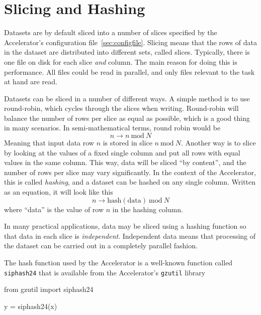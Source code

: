 \section{Slicing and Hashing}
\label{sec:slicing_and_hashing}

Datasets are by default sliced into a number of slices specified by
the Accelerator's configuration file~\ref{sec:configfile}.  Slicing means that the
rows of data in the dataset are distributed into different sets,
called slices.  Typically, there is one file on disk for each slice
\textsl{and} column.  The main reason for doing this is performance.  All files
could be read in parallel, and only files relevant to the task at hand
are read.

Datasets can be sliced in a number of different ways.  A simple method
is to use round-robin, which cycles through the slices when writing.
Round-robin will balance the number of rows per slice as equal as
possible, which is a good thing in many scenarios.  In semi-mathematical
terms, round robin would be
\begin{equation*}
  n \longrightarrow n~\textrm{mod}~N
\end{equation*}
Meaning that input data row $n$ is stored in slice $n~\textrm{mod}~N$.
Another way is to slice by looking at the values of a fixed single
column and put all rows with equal values in the same column.  This
way, data will be sliced ``by content'', and the number of rows per
slice may vary significantly.  In the context of the Accelerator, this
is called \emph{hashing}, and a dataset can be hashed on any single
column.  Written as an equation, it will look like this
\begin{equation*}
  n \longrightarrow \textrm{hash}(\textrm{data})~\textrm{mod}~N
\end{equation*}
where ``data'' is the value of row $n$ in the hashing column.

In many practical applications, data may be sliced using a hashing
function so that data in each slice is \textsl{independent}.
Independent data means that processing of the dataset can be carried
out in a completely parallel fashion.

The hash function used by the Accelerator is a well-known function
called \texttt{siphash24} that is available from the
Accelerator's \texttt{gzutil} library
\begin{python}
from gzutil import siphash24

y = siphash24(x)
\end{python}



